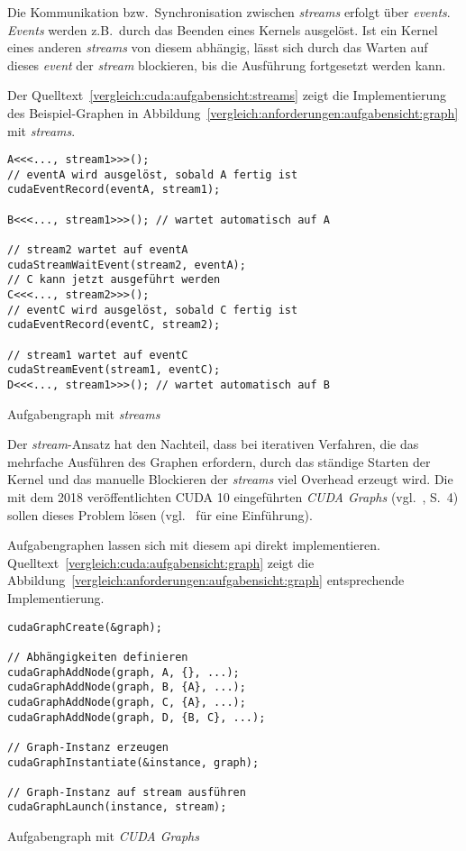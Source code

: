 Die Kommunikation bzw.\ Synchronisation zwischen \textit{streams} erfolgt über
\textit{events}. \textit{Events} werden z.B.\ durch das Beenden eines Kernels
ausgelöst. Ist ein Kernel eines anderen \textit{streams} von diesem abhängig,
lässt sich durch das Warten auf dieses \textit{event} der \textit{stream}
blockieren, bis die Ausführung fortgesetzt werden kann.

Der Quelltext~\ref{vergleich:cuda:aufgabensicht:streams} zeigt die
Implementierung des Beispiel-Graphen
in Abbildung~\ref{vergleich:anforderungen:aufgabensicht:graph} mit
\textit{streams}.

\begin{code}
    \begin{verbatim}
A<<<..., stream1>>>();
// eventA wird ausgelöst, sobald A fertig ist
cudaEventRecord(eventA, stream1);

B<<<..., stream1>>>(); // wartet automatisch auf A

// stream2 wartet auf eventA
cudaStreamWaitEvent(stream2, eventA);
// C kann jetzt ausgeführt werden
C<<<..., stream2>>>();
// eventC wird ausgelöst, sobald C fertig ist
cudaEventRecord(eventC, stream2);

// stream1 wartet auf eventC
cudaStreamEvent(stream1, eventC);
D<<<..., stream1>>>(); // wartet automatisch auf B
    \end{verbatim}
    \caption{Aufgabengraph mit \textit{streams}}
    \label{vergleich:cuda:aufgabensicht:streams}
\end{code}

Der \textit{stream}-Ansatz hat den Nachteil, dass bei iterativen Verfahren, die
das mehrfache Ausführen des Graphen erfordern, durch das ständige Starten der
Kernel und das manuelle Blockieren der \textit{streams} viel Overhead erzeugt
wird. Die mit dem 2018 veröffentlichten CUDA 10 eingeführten
\textit{CUDA Graphs} (vgl.~\cite{cuda10rel}, S.\ 4) sollen dieses Problem lösen
(vgl.~\cite{ramarao2018} für eine Einführung).

Aufgabengraphen lassen sich mit diesem \gls{api} direkt implementieren.
Quelltext~\ref{vergleich:cuda:aufgabensicht:graph} zeigt die
Abbildung~\ref{vergleich:anforderungen:aufgabensicht:graph} entsprechende
Implementierung. 

\begin{code}
    \begin{verbatim}
cudaGraphCreate(&graph);

// Abhängigkeiten definieren
cudaGraphAddNode(graph, A, {}, ...);
cudaGraphAddNode(graph, B, {A}, ...);
cudaGraphAddNode(graph, C, {A}, ...);
cudaGraphAddNode(graph, D, {B, C}, ...);

// Graph-Instanz erzeugen
cudaGraphInstantiate(&instance, graph);

// Graph-Instanz auf stream ausführen
cudaGraphLaunch(instance, stream);
    \end{verbatim}
    \caption{Aufgabengraph mit \textit{CUDA Graphs}}
    \label{vergleich:cuda:aufgabensicht:graph}
\end{code}

